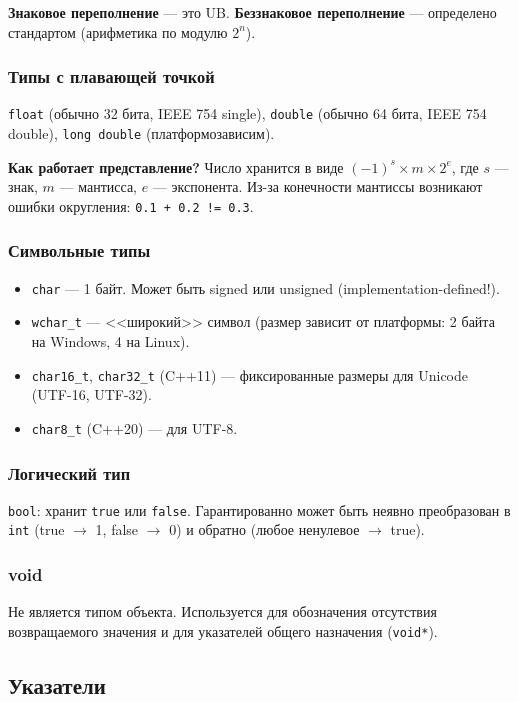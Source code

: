 \documentclass[12pt,a4paper]{article}
\begin{document}
\textbf{Знаковое переполнение} --- это UB. \textbf{Беззнаковое переполнение} --- определено стандартом (арифметика по модулю $2^n$).

\subsubsection{Типы с плавающей точкой}
\texttt{float} (обычно 32 бита, IEEE 754 single), \texttt{double} (обычно 64 бита, IEEE 754 double), \texttt{long double} (платформозависим).

\textbf{Как работает представление?} Число хранится в виде $(-1)^s \times m \times 2^e$, где $s$ --- знак, $m$ --- мантисса, $e$ --- экспонента. Из-за конечности мантиссы возникают ошибки округления: \texttt{0.1 + 0.2 != 0.3}.

\subsubsection{Символьные типы}
\begin{itemize}
    \item \texttt{char} --- 1 байт. Может быть signed или unsigned (implementation-defined!).
    \item \texttt{wchar\_t} --- <<широкий>> символ (размер зависит от платформы: 2 байта на Windows, 4 на Linux).
    \item \texttt{char16\_t}, \texttt{char32\_t} (C++11) --- фиксированные размеры для Unicode (UTF-16, UTF-32).
    \item \texttt{char8\_t} (C++20) --- для UTF-8.
\end{itemize}

\subsubsection{Логический тип}
\texttt{bool}: хранит \texttt{true} или \texttt{false}. Гарантированно может быть неявно преобразован в \texttt{int} (true $\to$ 1, false $\to$ 0) и обратно (любое ненулевое $\to$ true).

\subsubsection{void}
Не является типом объекта. Используется для обозначения отсутствия возвращаемого значения и для указателей общего назначения (\texttt{void*}).

\subsection{Указатели}
\end{document}
